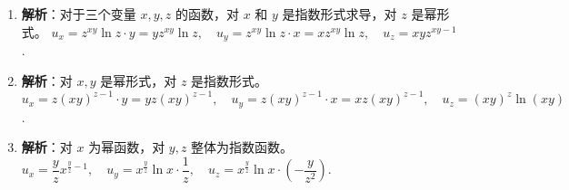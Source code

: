 \documentclass[lang=cn,11pt]{elegantbook}
\begin{document}
\begin{solution}
\begin{enumerate}
  \[u_x = \dfrac{-2x}{(x^2+y^2+z^2)^2}, \quad u_y = \dfrac{-2y}{(x^2+y^2+z^2)^2}, \quad u_z = \dfrac{-2z}{(x^2+y^2+z^2)^2}\]
  \item[(10)] \textbf{解析}：对于三个变量 $x, y, z$ 的函数，对 $x$ 和 $y$ 是指数形式求导，对 $z$ 是幂形式。
  $u_x = z^{xy}\ln z \cdot y = yz^{xy}\ln z, \quad u_y = z^{xy}\ln z \cdot x = xz^{xy}\ln z, \quad u_z = xy z^{xy-1}$.
  \item[(11)] \textbf{解析}：对 $x, y$ 是幂形式，对 $z$ 是指数形式。
  $u_x = z(xy)^{z-1} \cdot y = yz(xy)^{z-1}, \quad u_y = z(xy)^{z-1} \cdot x = xz(xy)^{z-1}, \quad u_z = (xy)^z \ln(xy)$.
  \item[(12)] \textbf{解析}：对 $x$ 为幂函数，对 $y, z$ 整体为指数函数。
  $u_x = \dfrac{y}{z} x^{\frac{y}{z}-1}, \quad u_y = x^{\frac{y}{z}}\ln x \cdot \dfrac{1}{z}, \quad u_z = x^{\frac{y}{z}}\ln x \cdot \left(-\dfrac{y}{z^2}\right)$.
\end{enumerate}
\end{solution}
\end{document}
